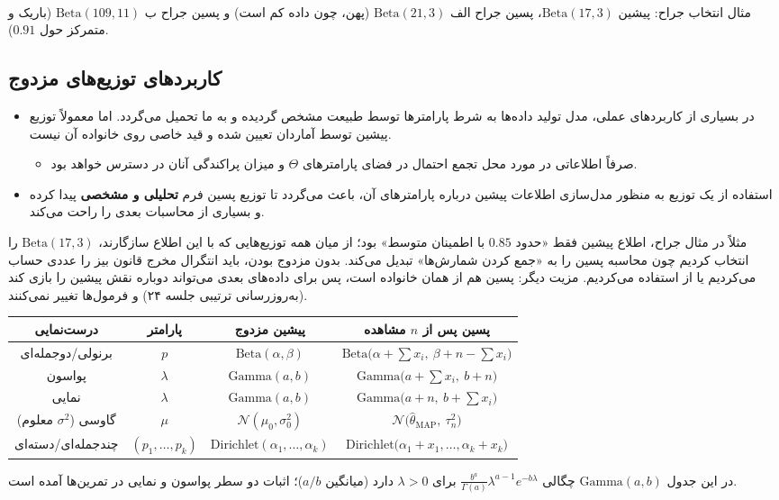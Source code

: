 \begin{center}
\begin{tikzpicture}
\end{tikzpicture}\\
{\small مثال انتخاب جراح: پیشین $\mathrm{Beta}(17,3)$، پسین جراح الف $\mathrm{Beta}(21,3)$ (پهن، چون داده کم است) و پسین جراح ب $\mathrm{Beta}(109,11)$ (باریک و متمرکز حول $0.91$).}
\end{center}

\subsection{کاربردهای توزیع‌های مزدوج}
\begin{itemize}
\item در بسیاری از کاربردهای عملی، مدل تولید داده‌ها به شرط پارامترها توسط طبیعت مشخص گردیده و به ما تحمیل می‌گردد. اما معمولاً توزیع پیشین توسط آماردان تعیین شده و قید خاصی روی خانواده آن نیست.
\begin{itemize}
\item صرفاً اطلاعاتی در مورد محل تجمع احتمال در فضای پارامترهای $\Theta$ و میزان پراکندگی آنان در دسترس خواهد بود.
\end{itemize}
\item استفاده از  یک توزیع به منظور مدل‌سازی اطلاعات پیشین درباره پارامترهای آن، باعث می‌گردد تا توزیع پسین فرم \textbf{تحلیلی و مشخصی} پیدا کرده و بسیاری از محاسبات بعدی را راحت می‌کند.
\end{itemize}
مثلاً در مثال جراح، اطلاع پیشین فقط «حدود $0.85$ با اطمینان متوسط» بود؛ از میان همه توزیع‌هایی که با این اطلاع سازگارند، $\mathrm{Beta}(17,3)$ را انتخاب کردیم چون محاسبه پسین را به «جمع کردن شمارش‌ها» تبدیل می‌کند. بدون مزدوج بودن، باید انتگرال مخرج قانون بیز را عددی حساب می‌کردیم یا از  استفاده می‌کردیم. مزیت دیگر: پسین هم از همان خانواده است، پس برای داده‌های بعدی می‌تواند دوباره نقش پیشین را بازی کند (به‌روزرسانی ترتیبی جلسه ۲۴) و فرمول‌ها تغییر نمی‌کنند.

\begin{center}
\renewcommand{\arraystretch}{1.5}
\begin{tabular}{c|c|c|c}
درست‌نمایی & پارامتر & پیشین مزدوج & پسین پس از $n$ مشاهده\\\hline
برنولی/دوجمله‌ای & $p$ & $\mathrm{Beta}(\alpha,\beta)$ & $\mathrm{Beta}\big(\alpha+\sum x_i,\ \beta+n-\sum x_i\big)$\\
پواسون & $\lambda$ & $\mathrm{Gamma}(a,b)$ & $\mathrm{Gamma}\big(a+\sum x_i,\ b+n\big)$\\
نمایی & $\lambda$ & $\mathrm{Gamma}(a,b)$ & $\mathrm{Gamma}\big(a+n,\ b+\sum x_i\big)$\\
گاوسی ($\sigma^2$ معلوم) & $\mu$ & $\mathcal N(\mu_0,\sigma_0^2)$ & $\mathcal N\big(\hat\theta_{\mathrm{MAP}},\ \tau_n^2\big)$\\
چندجمله‌ای/دسته‌ای & $(p_1,\ldots,p_k)$ & $\mathrm{Dirichlet}(\alpha_1,\ldots,\alpha_k)$ & $\mathrm{Dirichlet}\big(\alpha_1+x_1,\ldots,\alpha_k+x_k\big)$
\end{tabular}
\end{center}
در این جدول $\mathrm{Gamma}(a,b)$ چگالی $\frac{b^a}{\Gamma(a)}\lambda^{a-1}e^{-b\lambda}$ برای $\lambda>0$ دارد (میانگین $a/b$)؛ اثبات دو سطر پواسون و نمایی در تمرین‌ها آمده است.

